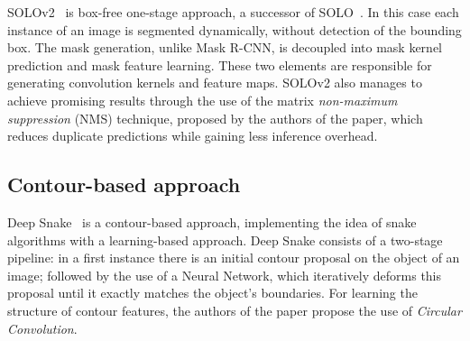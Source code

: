 \documentclass[10pt,twocolumn,letterpaper]{article}
\begin{document}
\noindent
\indent SOLOv2~\cite{Authors6_SOLOv2} is box-free one-stage approach, a successor of SOLO~\cite{solo}.
In this case each instance of an image is segmented dynamically, without detection of the bounding box.
The mask generation, unlike Mask R-CNN, is decoupled into mask kernel prediction and mask feature learning. These two elements are responsible for generating convolution kernels and feature maps. SOLOv2 also manages to achieve promising results through the use of the matrix \textit{non-maximum suppression} (NMS) technique, proposed by the authors of the paper, which reduces duplicate predictions while gaining less inference overhead.
\subsection{Contour-based approach}
Deep Snake~\cite{Authors7_deepsnake} is a contour-based approach, implementing the idea of snake algorithms with a learning-based approach. Deep Snake consists of a two-stage pipeline: in a first instance there is an initial contour proposal on the object of an image; followed by the use of a Neural Network, which iteratively deforms this proposal until it exactly matches the object's boundaries. For learning the structure of contour features, the authors of the paper propose the use of \textit{Circular Convolution}.
\end{document}
